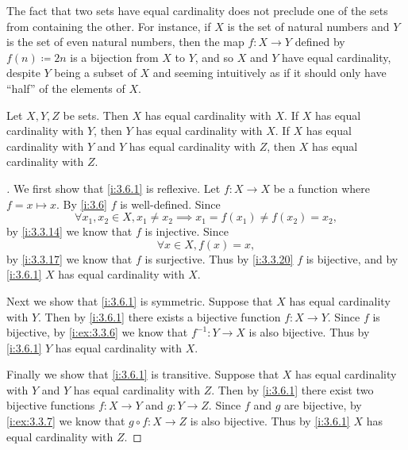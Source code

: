\setcounter{thm}{2}
\begin{rmk}\label{i:3.6.3}
  The fact that two sets have equal cardinality does not preclude one of the sets from containing the other.
  For instance, if \(X\) is the set of natural numbers and \(Y\) is the set of even natural numbers, then the map \(f : X \to Y\) defined by \(f(n) \coloneqq 2n\) is a bijection from \(X\) to \(Y\), and so \(X\) and \(Y\) have equal cardinality, despite \(Y\) being a subset of \(X\) and seeming intuitively as if it should only have ``half'' of the elements of \(X\).
\end{rmk}

\begin{prop}\label{i:3.6.4}
  Let \(X, Y, Z\) be sets.
  Then \(X\) has equal cardinality with \(X\).
  If \(X\) has equal cardinality with \(Y\), then \(Y\) has equal cardinality with \(X\).
  If \(X\) has equal cardinality with \(Y\) and \(Y\) has equal cardinality with \(Z\), then \(X\) has equal cardinality with \(Z\).
\end{prop}

\begin{proof}[]
  We first show that \cref{i:3.6.1} is reflexive.
  Let \(f : X \to X\) be a function where \(f = x \mapsto x\).
  By \cref{i:3.6} \(f\) is well-defined.
  Since
  \[
    \forall x_1, x_2 \in X, x_1 \neq x_2 \implies x_1 = f(x_1) \neq f(x_2) = x_2,
  \]
  by \cref{i:3.3.14} we know that \(f\) is injective.
  Since
  \[
    \forall x \in X, f(x) = x,
  \]
  by \cref{i:3.3.17} we know that \(f\) is surjective.
  Thus by \cref{i:3.3.20} \(f\) is bijective, and by \cref{i:3.6.1} \(X\) has equal cardinality with \(X\).

  Next we show that \cref{i:3.6.1} is symmetric.
  Suppose that \(X\) has equal cardinality with \(Y\).
  Then by \cref{i:3.6.1} there exists a bijective function \(f : X \to Y\).
  Since \(f\) is bijective, by \cref{i:ex:3.3.6} we know that \(f^{-1} : Y \to X\) is also bijective.
  Thus by \cref{i:3.6.1} \(Y\) has equal cardinality with \(X\).

  Finally we show that \cref{i:3.6.1} is transitive.
  Suppose that \(X\) has equal cardinality with \(Y\) and \(Y\) has equal cardinality with \(Z\).
  Then by \cref{i:3.6.1} there exist two bijective functions \(f : X \to Y\) and \(g : Y \to Z\).
  Since \(f\) and \(g\) are bijective, by \cref{i:ex:3.3.7} we know that \(g \circ f : X \to Z\) is also bijective.
  Thus by \cref{i:3.6.1} \(X\) has equal cardinality with \(Z\).
\end{proof}

